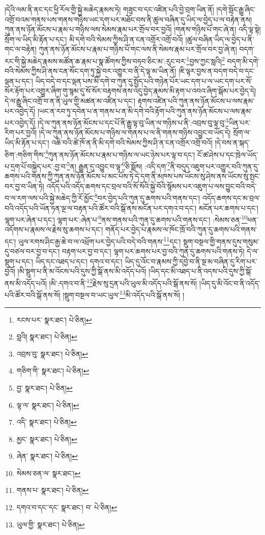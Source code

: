 །དེའི་ལམ་ནི་ནང་དང་ཕྱི་རོལ་གྱི་སྐྱེ་མཆེད་རྣམས་ཏེ། གཟུང་བ་དང་འཛིན་པའི་བྱེ་བྲག་ཡིན་ནོ། །དགེ་སློང་རྒྱུ་ཞིང་འགྲོ་བའམ་གནས་པས་གནས་གཉིས་ཡང་དག་པར་མཐོང་བས་ནི་ཚུལ་བཞིན་དུ་ཡིད་ལ་བྱེད་པ་ལ་བརྟེན་ནས། ཀུན་ནས་ཉོན་མོངས་པ་རྣམ་པ་གཉིས་ལས་སེམས་རྣམ་པར་གྲོལ་བར་བྱའོ། །གནས་གཉིས་པོ་གང་ཞེ་ན། འདི་ལྟ་སྟེ། སྲོག་ལ་ཡིད་མི་རྟོན་པ་དང་། མི་དགེ་བའི་སེམས་ཀྱིས་ཤི་ན་ངན་འགྲོར་འགྲོ་བའོ། །ཚུལ་བཞིན་ཡིད་ལ་བྱེད་པ་ནི་གང་ལ་བརྟེན། ཀུན་ནས་ཉོན་མོངས་པ་རྣམ་པ་གཉིས་པོ་གང་ལས་ནི་སེམས་རྣམ་པར་གྲོལ་བར་བྱ་ཞེ་ན། བདག་རང་གི་སྐྱེ་མཆེད་རྣམས་མཚོན་ཆ་རྣམ་པ་སྣ་ཚོགས་ཀྱིས་བཏབ་ཅིང་མ་:རུང་བར་\footnote{རངས་པར་  སྣར་ཐང་།  པེ་ཅིན། }བྱས་ཀྱང་སླའི།\footnote{བླའི།  སྣར་ཐང་།  པེ་ཅིན། } བདག་མི་དགེ་བའི་སེམས་ཀྱིས་ཤི་ནས་ངན་སོང་དག་ཏུ་སྐྱེ་བར་འགྱུར་བ་ནི་དེ་ལྟ་མ་ཡིན་ནོ། །ཇི་ལྟར་བྱས་ན་བདག་བདེ་བ་དང་ལྡན་པ་དང་། ཡིད་བདེ་བ་དང་ལྡན་པས་མི་དགེ་བ་ཀུན་དུ་སྤྱོད་པའི་གཉེན་པོར་ཡང་དག་པ་ལ་ཡང་དག་པར་སོ་སོར་རྟོག་པར་འགྱུར་ཞིག་གུ་སྙམ་དུ་སོ་སོར་བརྟགས་ནས་འདུ་བྱེད་རྣམས་མི་རྟག་པ་འབའ་ཞིག་སྒོམ་པར་བྱེད་དེ། དེ་ལ་རྒྱུ་ཞིང་འགྲོ་བ་ན་ནི་ཡུལ་གྱི་མཚན་མ་འཛིན་པ་དང་། རྟགས་འཛིན་པའི་ཀུན་ནས་ཉོན་མོངས་པ་ལས་རྣམ་པར་འབྱེད་དོ། །ཡང་ན་རབ་ཏུ་དབེན་པ་ན་གནས་པ་ན་མི་དགེ་བའི་རྟོག་པའི་ཀུན་ནས་ཉོན་མོངས་པ་ལས་རྣམ་པར་འབྱེད་དོ། །དེ་ལ་ཀུན་ནས་ཉོན་མོངས་པ་དང་པོ་ནི་རྒྱུ་ལྟ་བུ་ཡིན་ལ་གཉིས་པ་ནི་:འབྲས་བུ་ལྟ་བུ་\footnote{འབྲས་བུ་  སྣར་ཐང་།  པེ་ཅིན། }ཡིན་པར་རིག་པར་བྱའོ། །དེ་ལ་ཀུན་ནས་ཉོན་མོངས་པ་གཉིས་ལ་གནས་པ་ལ་ནི་གནས་གཉིས་འབྱུང་བ་ཡོད་དེ། སྲོག་ལ་ཡིད་མི་རྟོན་པ་དང་། འཆི་བའི་ཚེ་ཁོ་ན་ནི་མི་དགེ་བའི་སེམས་ཀྱིས་ཤི་ན་ངན་འགྲོར་འགྲོ་བའོ། །དེ་བས་ན་སྐད་ཅིག་:གཅིག་གིས་\footnote{གཅིག་གི་  སྣར་ཐང་།  པེ་ཅིན། }ཀུན་ནས་ཉོན་མོངས་པ་རྣམ་པ་གཉིས་ལ་ཡང་ཉེས་པར་ལྟ་བ་དང་། ངོ་ཚ་ཤེས་པ་དང་ཁྲེལ་ཡོད་པ་དྲག་པོ་བསྐྱེད་པར་:བྱ་བ་\footnote{བྱ་  སྣར་ཐང་།  པེ་ཅིན། }ན། རྒྱུན་དུ་འབྱུང་བ་ལྟ་\footnote{ལྟ་ལ་  སྣར་ཐང་།  པེ་ཅིན། }ཅི་སྨོས། :འདི་དག་\footnote{འདི་  སྣར་ཐང་།  པེ་ཅིན། }ནི་བདུད་འཇུག་པར་འགྱུར་བའི་ཀུན་དུ་ཆགས་པའི་གནས་ཀྱི་ཀུན་ནས་ཉོན་མོངས་པ་མང་པོས་ཏེ་དེ་དག་ནི་མཁས་པས་ཡོངས་སུ་ཤེས་ནས་ཡོངས་སུ་སྤང་བར་བྱ་བ་ཡིན་ཏེ། འདོད་པའི་འདོད་ཆགས་དང་བྲལ་བའི་སོ་སོའི་སྐྱེ་བོའི་སྙོམས་པར་འཇུག་པ་ལས་བྱུང་བའི་བདེ་བ་ལ་རག་ལས་པའི་སྐྱེ་མཆེད་ཀྱི་རོ་མྱོང་\footnote{མྱང་  སྣར་ཐང་།  པེ་ཅིན། }བར་བྱེད་པའི་ཀུན་དུ་ཆགས་པའི་གནས་དང་། འདོད་ཆགས་དང་མ་བྲལ་བའི་འདོད་པའི་ཡོན་ཏན་ལྔ་ལ་བརྟན་པའི་ཚོར་བའི་སྒོ་ནས་མངོན་པར་དགའ་བ་དང་། མངོན་པར་ཆགས་པ་དང་། ལྷག་པར་ཞེན་པ་དང་། ལྷག་པར་:ཞེན་པ་\footnote{ཞེན་  སྣར་ཐང་།  པེ་ཅིན། }ནས་གནས་པའི་ཀུན་དུ་ཆགས་པའི་གནས་དང་། :སེམས་ཅན་\footnote{སེམས་ཅན་ལ་  སྣར་ཐང་། }ཕན་འདོགས་པ་རྣམས་ལ་རྗེས་སུ་ཆགས་པ་དང་། གནོད་པར་བྱེད་པ་རྣམས་ལ་ཁོང་ཁྲོ་བའི་ཀུན་དུ་ཆགས་པའི་གནས་དང་། ཡུལ་རགས་ཤིང་རྒྱ་ཆེ་བ་ལ་འཕྲོག་པར་བྱེད་པའི་བདེ་བའི་གནས་\footnote{གནས་པ་  སྣར་ཐང་།  པེ་ཅིན། }དང་། སྡུག་བསྔལ་གྱི་གནས་དུས་གསུམ་དུ་བཙལ་བར་བྱ་བ་དང་། བརྟག་པར་བྱ་བ་དང་། ལྷག་པར་ཆགས་པར་བྱ་བའི་ཀུན་དུ་ཆགས་པའི་གནས་ཏེ། དེ་ལ་སྡུག་པ་དང་། ཡིད་དང་འཐད་པ་དང་། དགའ་བ་དང་། ཡིད་དུ་འོང་བ་རྣམས་ཀྱི་དབྱེ་བ་ནི་སྔ་མ་བཞིན་དུ་རིག་པར་བྱའོ། །མི་སྡུག་པ་ནི་མ་འོངས་པའི་དུས་ཀྱི་སྒོ་ནས་མི་འདོད་པའོ། །ཡིད་དང་མི་འཐད་པ་ནི་འདས་པའི་དུས་ཀྱི་སྒོ་ནས་མི་འདོད་པའོ། །མི་:དགའ་བ་ནི་\footnote{དགའ་བ་དང་་དང་  སྣར་ཐང་། བ་  པེ་ཅིན། }རྗེས་སུ་དྲན་པའི་ཡུལ་མི་འདོད་པའི་སྒོ་ནས་སོ། །ཡིད་དུ་མི་འོང་བ་ནི་འདོད་པའི་ཚོར་བའི་སྒོ་ནས་སོ། །སྡུག་བསྔལ་བ་ཡང་ཡུལ་\footnote{ཡུལ་གྱི་  སྣར་ཐང་།  པེ་ཅིན། }མི་འདོད་པའི་སྒོ་ནས་སོ། །
